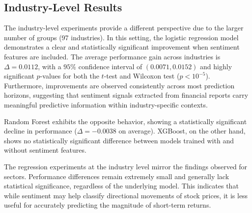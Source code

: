 \subsection{Industry-Level Results}

The industry-level experiments provide a different perspective due to the larger number of groups (97 industries). In this setting, the logistic regression model demonstrates a clear and statistically significant improvement when sentiment features are included. The average performance gain across industries is $\Delta = 0.0112$, with a $95\%$ confidence interval of $(0.0071, 0.0152)$ and highly significant $p$-values for both the $t$-test and Wilcoxon test ($p < 10^{-5}$). Furthermore, improvements are observed consistently across most prediction horizons, suggesting that sentiment signals extracted from financial reports carry meaningful predictive information within industry-specific contexts.

Random Forest exhibits the opposite behavior, showing a statistically significant decline in performance ($\Delta = -0.0038$ on average). XGBoost, on the other hand, shows no statistically significant difference between models trained with and without sentiment features.

The regression experiments at the industry level mirror the findings observed for sectors. Performance differences remain extremely small and generally lack statistical significance, regardless of the underlying model. This indicates that while sentiment may help classify directional movements of stock prices, it is less useful for accurately predicting the magnitude of short-term returns.

